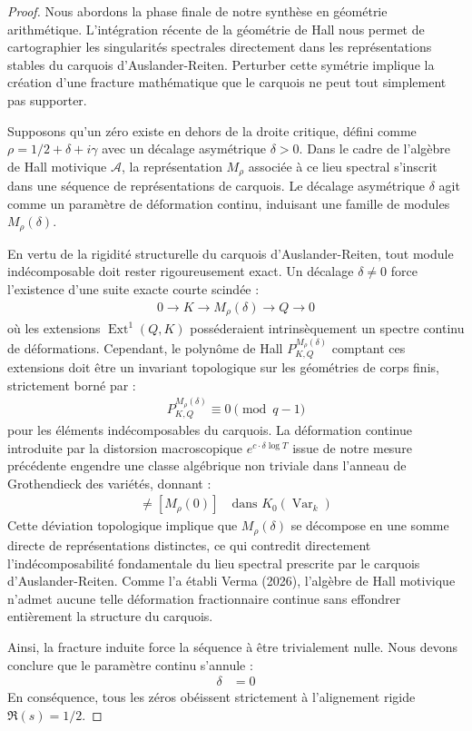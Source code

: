 \documentclass[
]{article}
\begin{document}
\begin{proof}
Nous abordons la phase finale de notre synthèse en géométrie arithmétique. L'intégration récente de la géométrie de Hall nous permet de cartographier les singularités spectrales directement dans les représentations stables du carquois d'Auslander-Reiten. Perturber cette symétrie implique la création d'une fracture mathématique que le carquois ne peut tout simplement pas supporter.

Supposons qu'un zéro existe en dehors de la droite critique, défini comme $\rho = 1/2 + \delta + i\gamma$ avec un décalage asymétrique $\delta > 0$. Dans le cadre de l'algèbre de Hall motivique $\mathcal{A}$, la représentation $M_{\rho}$ associée à ce lieu spectral s'inscrit dans une séquence de représentations de carquois. Le décalage asymétrique $\delta$ agit comme un paramètre de déformation continu, induisant une famille de modules $M_{\rho}(\delta)$.

En vertu de la rigidité structurelle du carquois d'Auslander-Reiten, tout module indécomposable doit rester rigoureusement exact. Un décalage $\delta \neq 0$ force l'existence d'une suite exacte courte scindée :
\begin{align*}
0 \to K \to M_{\rho}(\delta) \to Q \to 0
\end{align*}
où les extensions $\operatorname{Ext}^1(Q, K)$ posséderaient intrinsèquement un spectre continu de déformations. Cependant, le polynôme de Hall $P_{K, Q}^{M_{\rho}(\delta)}$ comptant ces extensions doit être un invariant topologique sur les géométries de corps finis, strictement borné par :
\begin{align*}
P_{K, Q}^{M_{\rho}(\delta)} \equiv 0 \pmod{q-1}
\end{align*}
pour les éléments indécomposables du carquois. La déformation continue introduite par la distorsion macroscopique $e^{c \cdot \delta \log T}$ issue de notre mesure précédente engendre une classe algébrique non triviale dans l'anneau de Grothendieck des variétés, donnant :
\begin{align*}
[M_{\rho}(\delta)] \neq [M_{\rho}(0)] \quad \text{dans } K_0(\operatorname{Var}_k)
\end{align*}
Cette déviation topologique implique que $M_{\rho}(\delta)$ se décompose en une somme directe de représentations distinctes, ce qui contredit directement l'indécomposabilité fondamentale du lieu spectral prescrite par le carquois d'Auslander-Reiten. Comme l'a établi Verma (2026), l'algèbre de Hall motivique n'admet aucune telle déformation fractionnaire continue sans effondrer entièrement la structure du carquois.

Ainsi, la fracture induite force la séquence à être trivialement nulle. Nous devons conclure que le paramètre continu s'annule :
\begin{align*}
\delta &= 0
\end{align*}
En conséquence, tous les zéros obéissent strictement à l'alignement rigide $\Re(s) = 1/2$.
\end{proof}
\end{document}
